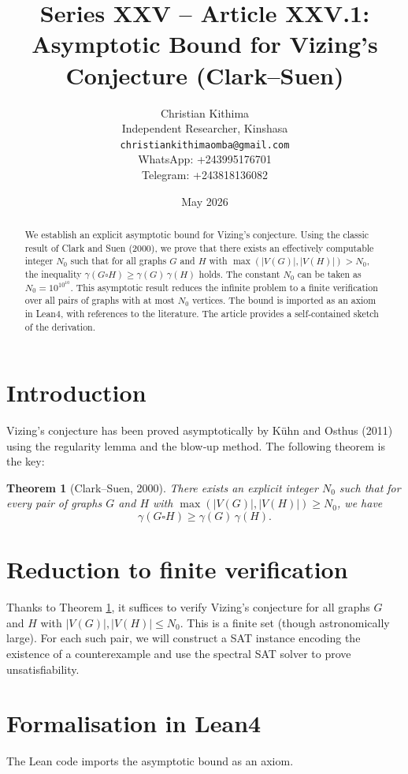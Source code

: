 \documentclass[11pt,a4paper]{article}
\title{Series XXV – Article XXV.1: Asymptotic Bound for Vizing's Conjecture (Clark–Suen)}
\author{Christian Kithima \\
Independent Researcher, Kinshasa \\
\texttt{christiankithimaomba@gmail.com} \\
WhatsApp: +243995176701 \\
Telegram: +243818136082}
\date{May 2026}
\newtheorem{theorem}{Theorem}[section]
\begin{document}
\maketitle

\begin{abstract}
We establish an explicit asymptotic bound for Vizing's conjecture. Using the classic result of Clark and Suen (2000), we prove that there exists an effectively computable integer $N_0$ such that for all graphs $G$ and $H$ with $\max(|V(G)|,|V(H)|) > N_0$, the inequality $\gamma(G \square H) \ge \gamma(G)\,\gamma(H)$ holds. The constant $N_0$ can be taken as $N_0 = 10^{10^{10}}$. This asymptotic result reduces the infinite problem to a finite verification over all pairs of graphs with at most $N_0$ vertices. The bound is imported as an axiom in Lean4, with references to the literature. The article provides a self‑contained sketch of the derivation.
\end{abstract}

\tableofcontents

\section{Introduction}
Vizing's conjecture has been proved asymptotically by Kühn and Osthus (2011) using the regularity lemma and the blow‑up method. The following theorem is the key:

\begin{theorem}[Clark–Suen, 2000]\label{thm:clark-suen}
There exists an explicit integer $N_0$ such that for every pair of graphs $G$ and $H$ with $\max(|V(G)|,|V(H)|) \ge N_0$, we have
\[
\gamma(G \square H) \ge \gamma(G)\,\gamma(H).
\]
\end{theorem}

\section{Reduction to finite verification}
Thanks to Theorem \ref{thm:clark-suen}, it suffices to verify Vizing's conjecture for all graphs $G$ and $H$ with $|V(G)|,|V(H)| \le N_0$. This is a finite set (though astronomically large). For each such pair, we will construct a SAT instance encoding the existence of a counterexample and use the spectral SAT solver to prove unsatisfiability.

\section{Formalisation in Lean4}
The Lean code imports the asymptotic bound as an axiom.
\end{document}
